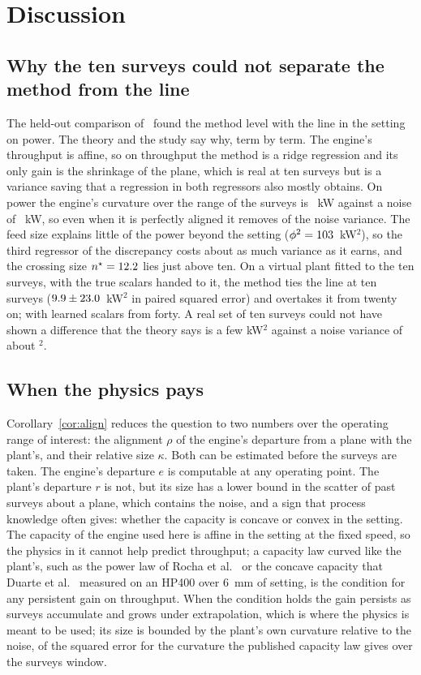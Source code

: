 \section{Discussion}\label{sec:discussion}

\subsection{Why the ten surveys could not separate the method from the line}

The held-out comparison of~\cite{cb002} found the method level with the line in the setting on power. The theory and the study
say why, term by term. The engine's throughput is affine, so on throughput the method is a ridge regression and its only gain
is the shrinkage of the plane, which is real at ten surveys but is a variance saving that a regression in both regressors
also mostly obtains. On power the engine's curvature over the range of the surveys is \eRmsS~kW against a noise of
\sigKw~kW, so even when it is perfectly aligned it removes \curvShareKw\pct{} of the noise variance. The feed size explains
little of the power beyond the setting ($\phi^2=103$~kW$^2$), so the third regressor of the discrepancy costs about as
much variance as it earns, and the crossing size $n^\star=12.2$ lies just above ten. On a virtual plant fitted to the ten
surveys, with the true scalars handed to it, the method ties the line at ten surveys ($9.9\pm23.0$~kW$^2$ in paired squared
error) and overtakes it from twenty on; with learned scalars from forty. A real set of ten surveys could not have shown a
difference that the theory says is a few kW$^2$ against a noise variance of about \sigKw$^2$.

\subsection{When the physics pays}

Corollary~\ref{cor:align} reduces the question to two numbers over the operating range of interest: the alignment $\rho$ of the
engine's departure from a plane with the plant's, and their relative size $\kappa$. Both can be estimated before the surveys are taken.
The engine's departure $e$ is computable at any operating point. The plant's departure $r$ is not, but its size has a lower
bound in the scatter of past surveys about a plane, which contains the noise, and a sign that process knowledge often gives:
whether the capacity is concave or convex in the setting. The capacity of the engine used here is affine in the setting at the
fixed speed, so the physics in it cannot help predict throughput; a capacity law curved like the plant's, such as the power
law of Rocha et al.~\cite{rocha} or the concave capacity that Duarte et al.~\cite{duarte} measured on an HP400 over 6~mm of
setting, is the condition for any persistent gain on throughput. When the condition holds the gain persists as surveys
accumulate and grows under extrapolation, which is where the physics is meant to be used; its size is bounded by the plant's
own curvature relative to the noise, \curvCeilTph\pct{} of the squared error for the curvature the published capacity law gives
over the surveys window.

